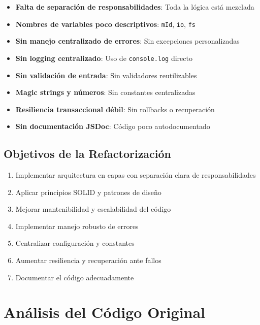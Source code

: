 \documentclass[12pt,a4paper]{article}
\begin{document}
\begin{itemize}
    \item \textbf{Falta de separación de responsabilidades}: Toda la lógica está mezclada
    \item \textbf{Nombres de variables poco descriptivos}: \texttt{mId}, \texttt{io}, \texttt{fs}
    \item \textbf{Sin manejo centralizado de errores}: Sin excepciones personalizadas
    \item \textbf{Sin logging centralizado}: Uso de \texttt{console.log} directo
    \item \textbf{Sin validación de entrada}: Sin validadores reutilizables
    \item \textbf{Magic strings y números}: Sin constantes centralizadas
    \item \textbf{Resiliencia transaccional débil}: Sin rollbacks o recuperación
    \item \textbf{Sin documentación JSDoc}: Código poco autodocumentado
\end{itemize}

\subsection{Objetivos de la Refactorización}

\begin{enumerate}
    \item Implementar arquitectura en capas con separación clara de responsabilidades
    \item Aplicar principios SOLID y patrones de diseño
    \item Mejorar mantenibilidad y escalabilidad del código
    \item Implementar manejo robusto de errores
    \item Centralizar configuración y constantes
    \item Aumentar resiliencia y recuperación ante fallos
    \item Documentar el código adecuadamente
\end{enumerate}

\newpage

\section{Análisis del Código Original}
\end{document}
